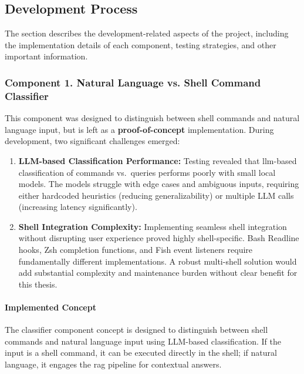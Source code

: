 \subsection{Development Process}

The section describes the development-related aspects of the project, including
the implementation details of each component, testing strategies, and other
important information.

\subsubsection{Component 1. Natural Language vs. Shell Command Classifier}

This component was designed to distinguish between shell commands and natural language input,
but is left as a \textbf{proof-of-concept} implementation. During development, two significant
challenges emerged:

\begin{enumerate}
  \item \textbf{LLM-based Classification Performance:} Testing revealed that \gls{llm}-based
    classification of commands vs.\ queries performs poorly with small local models. The models
    struggle with edge cases and ambiguous inputs, requiring either hardcoded heuristics
    (reducing generalizability) or multiple LLM calls (increasing latency significantly).
  \item \textbf{Shell Integration Complexity:} Implementing seamless shell integration without
    disrupting user experience proved highly shell-specific. Bash Readline hooks, Zsh completion
    functions, and Fish event listeners require fundamentally different implementations. A
    robust multi-shell solution would add substantial complexity and maintenance burden
    without clear benefit for this thesis.
\end{enumerate}

\paragraph{Implemented Concept}{}
The classifier component concept is designed to distinguish between shell commands and natural
language input using LLM-based classification. If the input is a shell command, it can be executed
directly in the shell; if natural language, it engages the \gls{rag} pipeline for contextual answers.

